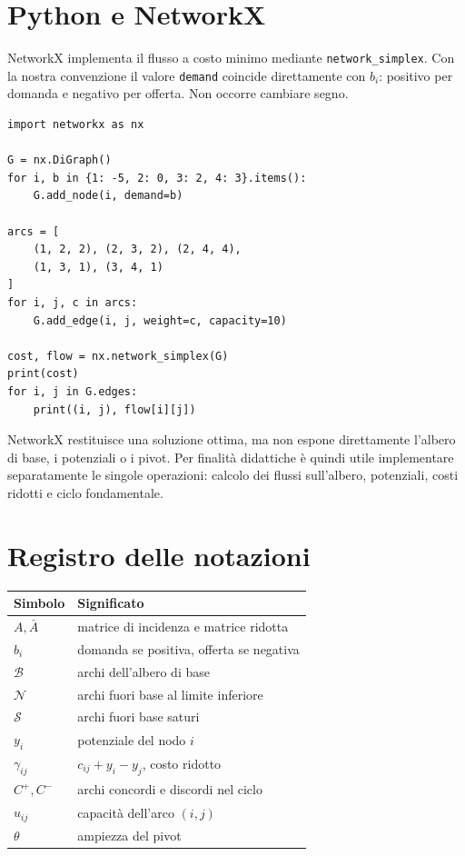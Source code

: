 \documentclass[11pt,a4paper]{article}
\newcommand{\Bset}{\mathcal{B}}
\newcommand{\Nset}{\mathcal{N}}
\newcommand{\Sset}{\mathcal{S}}
\begin{document}
\section{Python e NetworkX}

\begin{networkxbox}
NetworkX implementa il flusso a costo minimo mediante \texttt{network\_simplex}. Con la nostra convenzione il valore \texttt{demand} coincide direttamente con $b_i$: positivo per domanda e negativo per offerta. Non occorre cambiare segno.
\end{networkxbox}

\begin{lstlisting}[style=python,caption={Soluzione del problema dell'esempio con NetworkX}]
import networkx as nx

G = nx.DiGraph()
for i, b in {1: -5, 2: 0, 3: 2, 4: 3}.items():
    G.add_node(i, demand=b)

arcs = [
    (1, 2, 2), (2, 3, 2), (2, 4, 4),
    (1, 3, 1), (3, 4, 1)
]
for i, j, c in arcs:
    G.add_edge(i, j, weight=c, capacity=10)

cost, flow = nx.network_simplex(G)
print(cost)
for i, j in G.edges:
    print((i, j), flow[i][j])
\end{lstlisting}

NetworkX restituisce una soluzione ottima, ma non espone direttamente l'albero di base, i potenziali o i pivot. Per finalità didattiche è quindi utile implementare separatamente le singole operazioni: calcolo dei flussi sull'albero, potenziali, costi ridotti e ciclo fondamentale.

\section{Registro delle notazioni}

\begin{notationbox}
\begin{center}
\begin{tabular}{ll}
\toprule
Simbolo & Significato\\
\midrule
$A,\bar A$ & matrice di incidenza e matrice ridotta\\
$b_i$ & domanda se positiva, offerta se negativa\\
$\Bset$ & archi dell'albero di base\\
$\Nset$ & archi fuori base al limite inferiore\\
$\Sset$ & archi fuori base saturi\\
$y_i$ & potenziale del nodo $i$\\
$\gamma_{ij}$ & $c_{ij}+y_i-y_j$, costo ridotto\\
$C^+,C^-$ & archi concordi e discordi nel ciclo\\
$u_{ij}$ & capacità dell'arco $(i,j)$\\
$\theta$ & ampiezza del pivot\\
\bottomrule
\end{tabular}
\end{center}
\end{notationbox}
\end{document}
